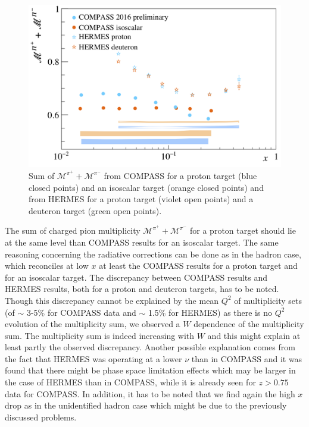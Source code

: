 \begin{figure}[!h]
  \centering
  \includegraphics[scale=0.5]{./gfx/pis.png}
  \caption{Sum of $\mathscr{M}^{\pi^+}+\mathscr{M}^{\pi^-}$ from COMPASS for a proton target (blue closed points) and an isoscalar target (orange closed points) and from HERMES for a proton target (violet open points) and a deuteron target (green open points).}
  \label{pic:pisum}
\end{figure}

The sum of charged pion multiplicity $\mathscr{M}^{\pi^+}+\mathscr{M}^{\pi^-}$ for a proton target should lie at the same level than COMPASS results for an isoscalar target. The same reasoning concerning the radiative corrections can be done as in the hadron case, which reconciles at low $x$ at least the COMPASS results for a proton target and for an isoscalar target. The discrepancy between COMPASS results and HERMES results, both for a proton and deuteron targets, has to be noted. Though this discrepancy cannot be explained by the mean $Q^2$ of multiplicity sets (of $\sim$ 3-5\% for COMPASS data and $\sim$ 1.5\% for HERMES) as there is no $Q^2$ evolution of the multiplicity sum, we observed a $W$ dependence of the multiplicity sum. The multiplicity sum is indeed increasing with $W$ and this might explain at least partly the observed discrepancy. Another possible explanation comes from the fact that HERMES was operating at a lower $\nu$ than in COMPASS and it was found that there might be phase space limitation effects which may be larger in the case of HERMES than in COMPASS, while it is already seen for $z>0.75$ data for COMPASS\cite{MarcinPubli}. In addition, it has to be noted that we find again the high $x$ drop as in the unidentified hadron case which might be due to the previously discussed problems.

